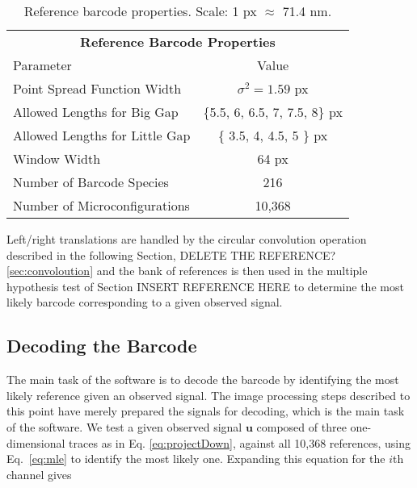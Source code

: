 \begin{table}[htbp] 	
\begin{center}
\begin{tabular}{l c}
\multicolumn{2}{c}{\textbf{Reference Barcode Properties}}\\
Parameter & Value \\
\hline
Point Spread Function Width  & $\sigma^2=1.59$ px \\
Allowed Lengths for Big Gap &  \{5.5, 6, 6.5, 7, 7.5, 8\} px \\
Allowed Lengths for Little Gap  & \{ 3.5, 4, 4.5, 5 \} px\\
Window Width & 64 px\\
Number of Barcode Species & 216 \\
Number of Microconfigurations & 10,368 \\
\hline
\end{tabular}
\caption{Reference barcode properties. Scale: 1 px $\approx$ 71.4 nm.\label{table:reference}}
\end{center}
\end{table}

Left/right translations are handled by the circular convolution operation described in the following Section, DELETE THE REFERENCE? \ref{sec:convoloution}  and the bank of references is then used in the multiple hypothesis test of Section INSERT REFERENCE HERE to determine the most likely barcode corresponding to a given observed signal.


\subsection{Decoding the Barcode}
The main task of the software is to decode the barcode by identifying the most likely reference given an observed signal. The image processing steps described to this point have merely prepared the signals for decoding, which is the main task of the software.  We test a given observed signal $\mathbf{u}$ composed of three one-dimensional traces as in Eq. 
\ref{eq:projectDown}, against all 10,368 references, using Eq.~\ref{eq:mle} to identify the most likely one. Expanding this equation for the $i$th channel gives

